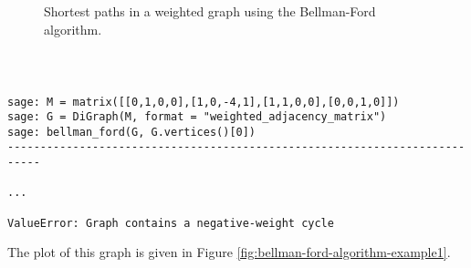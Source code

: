 \begin{figure}[!htbp]
\centering
{}
\caption{Shortest paths in a weighted graph using the Bellman-Ford
  algorithm.}
\label{fig:graph_algorithms:Bellman_Ford_example}
\end{figure}

%
\begin{center}
\fontsize{9pt}{9pt}
\selectfont
\tt
\begin{lstlisting}

sage: M = matrix([[0,1,0,0],[1,0,-4,1],[1,1,0,0],[0,0,1,0]])
sage: G = DiGraph(M, format = "weighted_adjacency_matrix")
sage: bellman_ford(G, G.vertices()[0])
---------------------------------------------------------------------------

...

ValueError: Graph contains a negative-weight cycle

\end{lstlisting}
\end{center}

The plot of this graph is given in Figure
\ref{fig:bellman-ford-algorithm-example1}.



